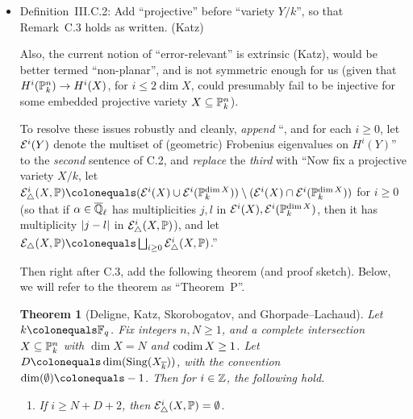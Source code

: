 \documentclass[12pt]{article}
\begin{document}
\begin{itemize}
    \item Definition~III.C.2:
    Add ``projective'' before ``variety $Y/k$'',
    so that Remark~C.3 holds as written.
    (Katz)
    
    
    
    
    Also, the current notion of ``error-relevant'' is extrinsic (Katz),
    would be better termed ``non-planar'',
    and is not symmetric enough for us (given that $H^i(\mathbb{P}^n_k)\to H^i(X)$, for $i\leq 2\dim{X}$, could presumably fail to be injective for some embedded projective variety $X\subseteq \mathbb{P}^n_k$).
    
    To resolve these issues robustly and cleanly,
    \emph{append} ``, and for each $i\geq 0$, let $\mathcal{E}^i(Y)$ denote the multiset of (geometric) Frobenius eigenvalues on $H^i(Y)$'' to the \emph{second} sentence of C.2,
    and \emph{replace} the \emph{third} with
    ``Now fix a projective variety $X/k$,
    let $\mcal{E}^i_{\triangle}(X,\PP)\defeq (\mcal{E}^i(X)\cup \mcal{E}^i(\PP^{\dim{X}}_k))\setminus (\mcal{E}^i(X)\cap \mcal{E}^i(\PP^{\dim{X}}_k))$ for $i\geq 0$
    (so that if $\alpha\in \overline{\mathbb{Q}}_\ell$ has multiplicities $j,l$ in $\mathcal{E}^i(X),\mathcal{E}^i(\mathbb{P}^{\dim{X}}_k)$, then it has multiplicity $\lvert j-l \rvert$ in $\mathcal{E}^i_{\triangle}(X,\mathbb{P})$),
    and let $\mcal{E}_{\triangle}(X,\PP)\defeq \bigsqcup_{i\geq 0}\mcal{E}^i_{\triangle}(X,\PP)$.''
    
    Then right after C.3, add the following theorem (and proof sketch).
    Below, we will refer to the theorem as ``Theorem~P''.
    \theoremstyle{plain}
    \newtheorem*{theorem*}{Theorem}
    \begin{theorem*}
    [Deligne, Katz, Skorobogatov, and Ghorpade--Lachaud]
    \label{THM:general-perversity-result}
    Let $k\defeq \FF_q$.
    Fix integers $n,N\geq 1$,
    and a complete intersection $X\subseteq \mathbb{P}^n_k$ with $\dim{X} = N$ and $\operatorname{codim}{X}\geq 1$.
    Let $D\defeq \dim(\map{Sing}(X_{\ol{k}}))$, with the convention $\dim(\emptyset)\defeq -1$.
    Then for $i\in \mathbb{Z}$, the following hold.
    \begin{enumerate}
        \item If $i\geq N+D+2$, then $\mathcal{E}^i_{\triangle}(X,\mathbb{P}) = \emptyset$.
        

\end{enumerate}
\end{theorem*}
\end{itemize}
\end{document}
